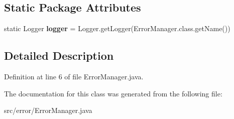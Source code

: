 \subsection*{Static Package Attributes}
\begin{DoxyCompactItemize}
\item 
\hypertarget{classerror_1_1_error_manager_abf11a50b38703340894a680bd8230144}{static Logger {\bfseries logger} = Logger.\-get\-Logger(Error\-Manager.\-class.\-get\-Name())}\label{classerror_1_1_error_manager_abf11a50b38703340894a680bd8230144}

\end{DoxyCompactItemize}


\subsection{Detailed Description}


Definition at line 6 of file Error\-Manager.\-java.



The documentation for this class was generated from the following file\-:\begin{DoxyCompactItemize}
\item 
src/error/Error\-Manager.\-java\end{DoxyCompactItemize}
